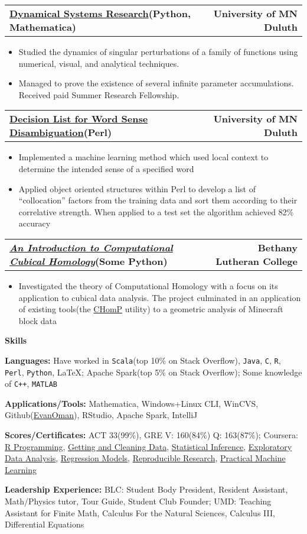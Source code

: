 \documentclass[letterpaper,10pt]{article}
\newcommand{\myitem}{\item[$\triangleright$]}
\newcommand{\resHeading}[1]{
	{
		\begin{tcolorbox}[size=title,oversize, sharp corners, colback=mygrey, colframe=mygrey]%
			\centering\textbf{\large #1}
		\end{tcolorbox} 
	}
}
\newcommand{\twoColResSubHeading}[2]{
	\begin{tabularx}{\textwidth}{Xr}
			\textbf{#1} & \textbf{#2}
	\end{tabularx}
}
\begin{document}
		\twoColResSubHeading{\href{https://www.researchgate.net/publication/281248352_Infinite_Levels_of_Complexity_in_a_Family_of_One-Dimensional_Singular_Dynamical_Systems}{Dynamical Systems Research}(Python, Mathematica)}{University of MN Duluth}
			\begin{itemize}
				\myitem Studied the dynamics of singular perturbations of a family of functions using numerical, visual, and analytical techniques.
				\myitem Managed to prove the existence of several infinite parameter accumulations. Received paid Summer Research Fellowship.
			\end{itemize}
		\twoColResSubHeading{\href{https://github.com/EvanOman/nlp-decision-list}{Decision List for Word Sense Disambiguation}(Perl)}{University of MN Duluth}
			\begin{itemize}
				\myitem Implemented a machine learning method which used local context to determine the intended sense of a specified word
				\myitem Applied object oriented structures within Perl to develop a list of ``collocation'' factors from the training data and sort them according to their correlative strength. When applied to a test set the algorithm achieved 82\% accuracy
			\end{itemize}
		\twoColResSubHeading{\href{https://drive.google.com/file/d/0B5IOv9SzzDlvdnowZVpKRzhXOU0/edit?usp=sharing}{\textit{An Introduction to Computational Cubical Homology}}(Some Python)}{Bethany Lutheran College}
			\begin{itemize}
				\myitem Investigated the theory of Computational Homology with a focus on its application to cubical data analysis. The project culminated in an application of existing tools(the \href{http://chomp.rutgers.edu/}{CHomP} utility) to a geometric analysis of Minecraft block data
			\end{itemize}
	\resHeading{Skills}
		\justifying
		
		\textbf{Languages:}
			Have worked in \verb!Scala!(top 10\% on Stack Overflow), \verb!Java!, \verb!C!, \verb!R!, \verb!Perl!, \verb!Python!, \LaTeX; Apache Spark(top 5\% on Stack Overflow); Some knowledge of \verb!C++!, \verb!MATLAB!

		\textbf{Applications/Tools:}
		Mathematica, Windows+Linux CLI, WinCVS, Github(\href{https://www.github.com/EvanOman}{EvanOman}), RStudio, Apache Spark, IntelliJ

		\textbf{Scores/Certificates:}
		ACT 33(99\%), GRE V: 160(84\%) Q: 163(87\%); Coursera: \href{https://www.coursera.org/account/accomplishments/records/cxq3vN5HB76be56t}{R Programming}, \href{https://www.coursera.org/account/accomplishments/records/Xt3sCA24Qz3Par7M}{Getting and Cleaning Data}, \href{https://www.coursera.org/account/accomplishments/records/yPex7nURcXCYdsse}{Statistical Inference}, \href{https://www.coursera.org/account/accomplishments/records/XMkgJcmHPGtNBXsU}{Exploratory Data Analysis}, \href{https://www.coursera.org/account/accomplishments/records/Qx8qaDCvw9ZNQtqP}{Regression Models}, \href{https://www.coursera.org/account/accomplishments/records/g5LfcvAD5rJuEnGX}{Reproducible Research},
		\href{https://www.coursera.org/account/accomplishments/verify/ZNTJVMJKSH}{Practical Machine Learning}

		\textbf{Leadership Experience:}
		BLC: Student Body President, Resident Assistant, Math/Physics tutor, Tour Guide, Student Club Founder; UMD: Teaching Assistant for Finite Math, Calculus For the Natural Sciences, Calculus III, Differential Equations
\end{document}
